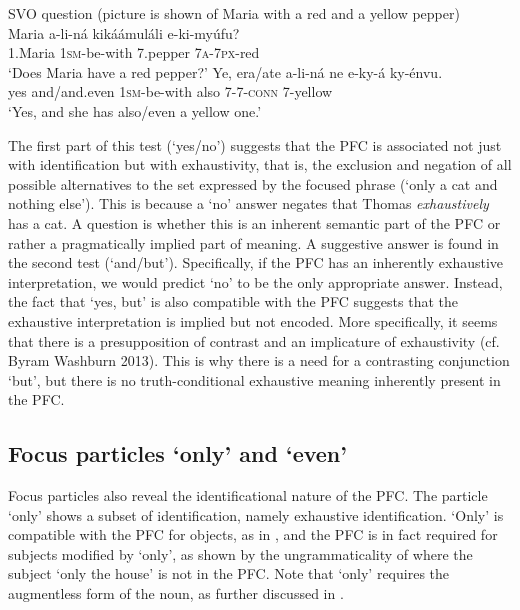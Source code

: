 \documentclass[output=paper]{langsci/langscibook}
\begin{document}
\ea\label{ex:vanderwal:19}
SVO question
       (picture is shown of Maria with a red and a yellow pepper)\\
\ea\label{ex:vanderwal:19a}
\gll      Maria    a-li-ná  kikáámuláli  e-ki-myúfu?\\
         1.Maria  \textsc{1sm}-be-with  7.pepper  \textsc{7a}-\textsc{7px}-red\\
\glt     ‘Does Maria have a red pepper?’
\ex\label{ex:vanderwal:19b}
\gll    Ye,  era/ate  a-li-ná  ne  e-ky-á    ky-énvu.\\
         yes  and/and.even  \textsc{1sm}-be-with  also  \textsc{7}-\textsc{7}-\textsc{conn}  7-yellow\\
\glt     ‘Yes, and she has also/even a yellow one.’
\z
\z

The first part of this test (‘yes/no’) suggests that the PFC is associated not just with identification but with exhaustivity, that is, the exclusion and negation of all possible alternatives to the set expressed by the focused phrase (‘only a cat and nothing else’). This is because a ‘no’ answer negates that Thomas \textit{exhaustively} has a cat. A question is whether this is an inherent semantic part of the PFC or rather a pragmatically implied part of meaning. A suggestive answer is found in the second test (‘and/but’). Specifically, if the PFC has an inherently exhaustive interpretation, we would predict ‘no’ to be the only appropriate answer. Instead, the fact that ‘yes, but’ is also compatible with the PFC suggests that the exhaustive interpretation is implied but not encoded. More specifically, it seems that there is a presupposition of contrast and an implicature of exhaustivity (cf. Byram Washburn 2013). This is why there is a need for a contrasting conjunction ‘but’, but there is no truth-conditional exhaustive meaning inherently present in the PFC. 

\subsection{Focus particles ‘only’ and ‘even’}\label{sec:vanderwal:3.4} %

Focus particles also reveal the identificational nature of the PFC. The particle ‘only’ shows a subset of identification, namely exhaustive identification. ‘Only’ is compatible with the PFC for objects, as in , and the PFC is in fact required for subjects modified by ‘only’, as shown by the ungrammaticality of  where the subject ‘only the house’ is not in the PFC. Note that ‘only’ requires the augmentless form of the noun, as further discussed in .
\end{document}
